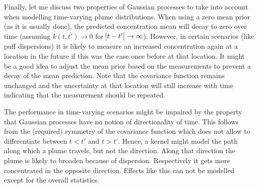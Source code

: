 Finally, let me discuss two properties of Gaussian processes to take into 
account when modelling time-varying plume distributions. When using a zero mean 
prior (as it is usually done), the predicted concentration mean will decay to 
zero over time (assuming $k(t, t') \rightarrow 0$ for $\abs{t - t'} \rightarrow 
\infty$). However, in certain scenarios (like puff dispersions) it is likely to 
measure an increased concentration again at a location in the future if this was 
the case once before at that location. It might be a good idea to adjust the 
mean prior based on the measurements to prevent a decay of the mean prediction.  
Note that the covariance function remains unchanged and the uncertainty at that 
location will still increase with time indicating that the measurement should be 
repeated.

The performance in time-varying scenarios might be impaired by the property that 
Gaussian processes have no notion of directionality of time. This follows from 
the (required) symmetry of the covariance function which does not allow to 
differentiate between $t < t'$ and $t > t'$. Hence, a kernel might model the 
path along which a plume travels, but not the direction. Along that direction 
the plume is likely to broaden because of dispersion. Respectively it gets more 
concentrated in the opposite direction. Effects like this can not be modelled 
except for the overall statistics.
